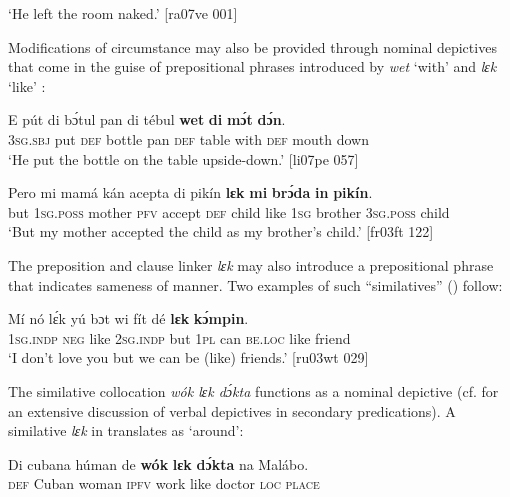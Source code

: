 \glt ‘He left the room naked.’ [ra07ve 001]
\z

Modifications of circumstance may also be provided through nominal depictives that come in the guise of prepositional phrases introduced by \textit{wet} ‘with’  and \textit{lɛk} ‘like’ :


\ea%
    \label{ex:key:885}
    \gll E    pút  di  bɔ́tul  pan  di  tébul  \textbf{wet}    \textbf{di}  \textbf{mɔ́t}    \textbf{dɔ́n}.\\
\textsc{3sg.sbj}  put  \textsc{def}  bottle  pan  \textsc{def}  table  with    \textsc{def}  mouth  down\\

\glt ‘He put the bottle on the table upside-down.’ [li07pe 057]
\z


\ea%
    \label{ex:key:886}
    \gll Pero    mi    mamá  kán  acepta  di  pikín  \textbf{lɛk}  \textbf{mi}
\textbf{brɔ́da}  \textbf{in}    \textbf{pikín}.\\
but    \textsc{1sg.poss}  mother  \textsc{pfv}  accept  \textsc{def}  child  like  \textsc{1sg}
brother  \textsc{3sg.poss}  child\\

\glt ‘But my mother accepted the child as my brother’s child.’ [fr03ft 122]
\z

The preposition and clause linker \textit{lɛk} may also introduce a prepositional phrase that indicates sameness of manner. Two examples of such “similatives” (\citealt{HaspelmathBuchholz1998}) follow: 


\ea%
    \label{ex:key:887}
    \gll Mí    nó  lɛ́k  yú    bɔt  wi  fít  dé    \textbf{lɛk}  \textbf{kɔ́mpin}.\\
\textsc{1sg.indp}  \textsc{neg}  like  \textsc{2sg.indp}  but  \textsc{1pl}  can  \textsc{be.loc}  like  friend\\

\glt ‘I don’t love you but we can be (like) friends.’ [ru03wt 029]
\z

The similative collocation \textit{wók lɛk dɔ́kta} functions as a nominal depictive  (cf.  for an extensive discussion of verbal depictives in secondary predications). A similative \textit{lɛk} in  translates as ‘around’: 


\ea%
    \label{ex:key:888}
    \gll Di  cubana  húman  de  \textbf{wók}    \textbf{lɛk}  \textbf{dɔ́kta}  na  Malábo.\\
\textsc{def}  Cuban  woman  \textsc{ipfv}  work  like  doctor  \textsc{loc}  \textsc{place}\\

